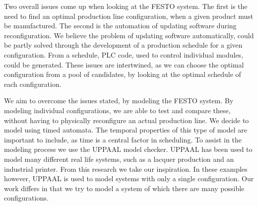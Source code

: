 Two overall issues come up when looking at the FESTO system. The first is the need to find an optimal production line configuration, when a given product must be manufactured. The second is the automation of updating software during reconfiguration. We believe the problem of updating software automatically, could be partly solved through the development of a production schedule for a given configuration. From a schedule, PLC code, used to control individual modules, could be generated. These issues are intertwined, as we can choose the optimal configuration from a pool of candidates, by looking at the optimal schedule of each configuration.

We aim to overcome the issues stated, by modeling the FESTO system. By modeling individual configurations, we are able to test and compare these, without having to physically reconfigure an actual production line. We decide to model using timed automata. The temporal properties of this type of model are important to include, as time is a central factor in scheduling. To assist in the modeling process we use the UPPAAL model checker\cite{Larsen97uppaalin}. UPPAAL has been used to model many different real life systems, such as a lacquer production\cite{so54514} and an industrial printer\cite{Igna2008}. From this research we take our inspiration. In these examples however, UPPAAL is used to model systems with only a single configuration. Our work differs in that we try to model a system of which there are many possible configurations. 
